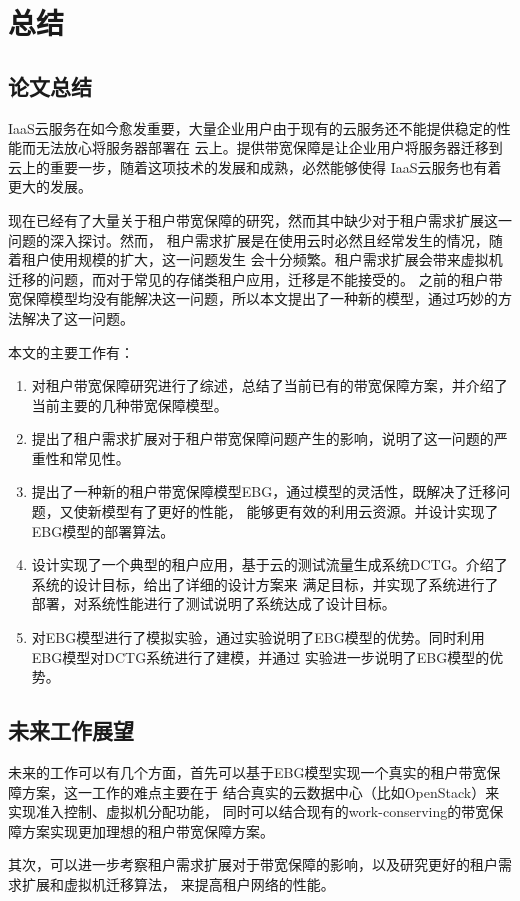 

\chapter{总结}
\label{conclu}
\section{论文总结}
IaaS云服务在如今愈发重要，大量企业用户由于现有的云服务还不能提供稳定的性能而无法放心将服务器部署在
云上。提供带宽保障是让企业用户将服务器迁移到云上的重要一步，随着这项技术的发展和成熟，必然能够使得
IaaS云服务也有着更大的发展。

现在已经有了大量关于租户带宽保障的研究，然而其中缺少对于租户需求扩展这一问题的深入探讨。然而，
租户需求扩展是在使用云时必然且经常发生的情况，随着租户使用规模的扩大，这一问题发生
会十分频繁。租户需求扩展会带来虚拟机迁移的问题，而对于常见的存储类租户应用，迁移是不能接受的。
之前的租户带宽保障模型均没有能解决这一问题，所以本文提出了一种新的模型，通过巧妙的方法解决了这一问题。

本文的主要工作有：

\begin{enumerate}
\item 对租户带宽保障研究进行了综述，总结了当前已有的带宽保障方案，并介绍了当前主要的几种带宽保障模型。
\item 提出了租户需求扩展对于租户带宽保障问题产生的影响，说明了这一问题的严重性和常见性。
\item 提出了一种新的租户带宽保障模型EBG，通过模型的灵活性，既解决了迁移问题，又使新模型有了更好的性能，
能够更有效的利用云资源。并设计实现了EBG模型的部署算法。
\item 设计实现了一个典型的租户应用，基于云的测试流量生成系统DCTG。介绍了系统的设计目标，给出了详细的设计方案来
满足目标，并实现了系统进行了部署，对系统性能进行了测试说明了系统达成了设计目标。
\item 对EBG模型进行了模拟实验，通过实验说明了EBG模型的优势。同时利用EBG模型对DCTG系统进行了建模，并通过
实验进一步说明了EBG模型的优势。
\end{enumerate}

\section{未来工作展望}
未来的工作可以有几个方面，首先可以基于EBG模型实现一个真实的租户带宽保障方案，这一工作的难点主要在于
结合真实的云数据中心（比如OpenStack）来实现准入控制、虚拟机分配功能，
同时可以结合现有的work-conserving的带宽保障方案实现更加理想的租户带宽保障方案。

其次，可以进一步考察租户需求扩展对于带宽保障的影响，以及研究更好的租户需求扩展和虚拟机迁移算法，
来提高租户网络的性能。
